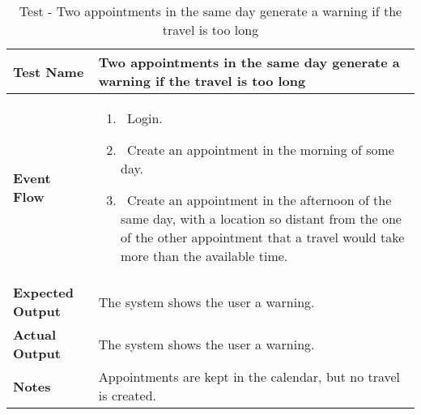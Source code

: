 \begin{table}[h]	
\centering
\def\arraystretch{1.5}
\begin{tabular}{|m{7cm}|m{7cm}|}
	\hline
	\textbf{Test Name}            &  Two appointments in the same day generate a warning if the travel is too long  \\ \hline
	\textbf{Event Flow}             &   
		\begin{enumerate}
			\item~Login.
			\item~Create an appointment in the morning of some day.
			\item~Create an appointment in the afternoon of the same day, with a location so distant from the one of the other appointment that a travel would take more than the available time.
		\end{enumerate}
	\\ \hline
	\textbf{Expected Output}  &  The system shows the user a warning.   \\ \hline
	\textbf{Actual Output}       &   The system shows the user a warning.  \\ \hline
	\textbf{Notes} &  Appointments are kept in the calendar, but no travel is created.   \\ \hline
\end{tabular}
\caption{Test - Two appointments in the same day generate a warning if the travel is too long}
\end{table}


